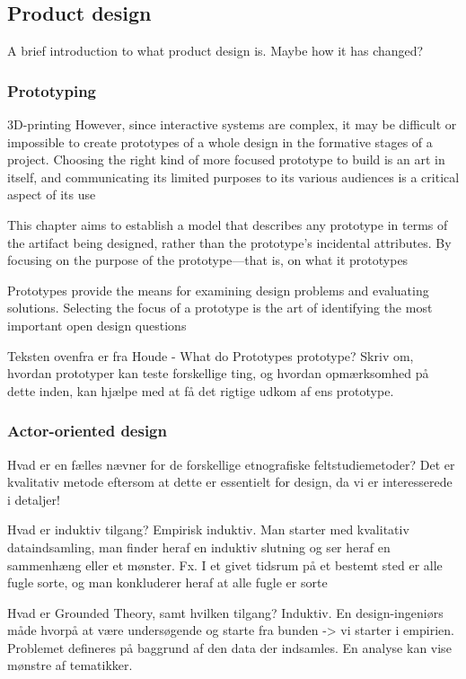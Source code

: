 \subsection{Product design}
A brief introduction to what product design is. Maybe how it has changed?

\subsubsection{Prototyping}




3D-printing
However, since interactive systems are complex, it may be difficult or impossible to create prototypes of a whole design in the formative stages of a project.
Choosing the right kind of more focused prototype to build is an art in itself, and communicating its limited purposes to its various audiences is a critical aspect of its use

This chapter aims to establish a model that describes any prototype in terms of the artifact being designed, rather than the prototype's incidental attributes. By focusing on the purpose of the prototype—that is, on what it prototypes

Prototypes provide the means for examining design problems and evaluating solutions. Selecting the focus of a prototype is the art of identifying the most important open design questions

Teksten ovenfra er fra Houde - What do Prototypes prototype?
Skriv om, hvordan prototyper kan teste forskellige ting, og hvordan opmærksomhed på dette inden, kan hjælpe med at få det rigtige udkom af ens prototype.

\subsubsection{Actor-oriented design}
Hvad er en fælles nævner for de forskellige etnografiske feltstudiemetoder?
Det er kvalitativ metode eftersom at dette er essentielt for design, da vi er interesserede i detaljer!

Hvad er induktiv tilgang?
Empirisk induktiv. Man starter med kvalitativ dataindsamling, man finder heraf en induktiv slutning og ser heraf en sammenhæng eller et mønster.
Fx. I et givet tidsrum på et bestemt sted er alle fugle sorte, og man konkluderer heraf at alle fugle er sorte

Hvad er Grounded Theory, samt hvilken tilgang?
Induktiv. En design-ingeniørs måde hvorpå at være undersøgende og starte fra bunden -> vi starter i empirien.
Problemet defineres på baggrund af den data der indsamles. En analyse kan vise mønstre af tematikker.

